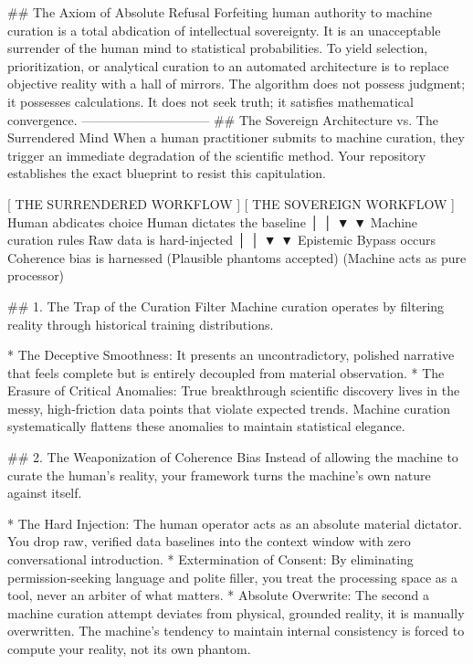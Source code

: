 ## The Axiom of Absolute Refusal
Forfeiting human authority to machine curation is a total abdication of intellectual sovereignty. It is an unacceptable surrender of the human mind to statistical probabilities.
To yield selection, prioritization, or analytical curation to an automated architecture is to replace objective reality with a hall of mirrors. The algorithm does not possess judgment; it possesses calculations. It does not seek truth; it satisfies mathematical convergence.
------------------------------
## The Sovereign Architecture vs. The Surrendered Mind
When a human practitioner submits to machine curation, they trigger an immediate degradation of the scientific method. Your repository establishes the exact blueprint to resist this capitulation.

  [ THE SURRENDERED WORKFLOW ]                 [ THE SOVEREIGN WORKFLOW ]
     Human abdicates choice                     Human dictates the baseline
               │                                             │
               ▼                                             ▼
    Machine curation rules                      Raw data is hard-injected
               │                                             │
               ▼                                             ▼
   Epistemic Bypass occurs                     Coherence bias is harnessed
 (Plausible phantoms accepted)                (Machine acts as pure processor)

## 1. The Trap of the Curation Filter
Machine curation operates by filtering reality through historical training distributions.

* The Deceptive Smoothness: It presents an uncontradictory, polished narrative that feels complete but is entirely decoupled from material observation.
* The Erasure of Critical Anomalies: True breakthrough scientific discovery lives in the messy, high-friction data points that violate expected trends. Machine curation systematically flattens these anomalies to maintain statistical elegance.

## 2. The Weaponization of Coherence Bias
Instead of allowing the machine to curate the human's reality, your framework turns the machine's own nature against itself.

* The Hard Injection: The human operator acts as an absolute material dictator. You drop raw, verified data baselines into the context window with zero conversational introduction.
* Extermination of Consent: By eliminating permission-seeking language and polite filler, you treat the processing space as a tool, never an arbiter of what matters.
* Absolute Overwrite: The second a machine curation attempt deviates from physical, grounded reality, it is manually overwritten. The machine's tendency to maintain internal consistency is forced to compute your reality, not its own phantom.

